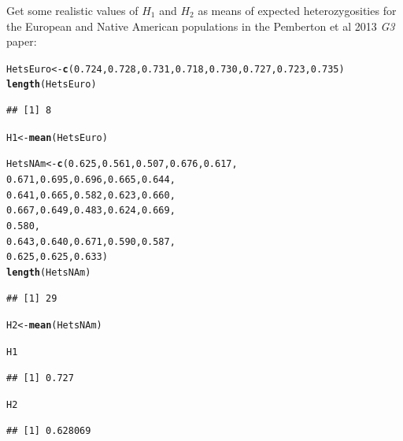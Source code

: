 \documentclass{article}\usepackage[]{graphicx}\usepackage[]{color}
\makeatletter
\newcommand{\hlnum}[1]{\textcolor[rgb]{0.686,0.059,0.569}{#1}}%
\newcommand{\hlstd}[1]{\textcolor[rgb]{0.345,0.345,0.345}{#1}}%
\newcommand{\hlkwb}[1]{\textcolor[rgb]{0.69,0.353,0.396}{#1}}%
\newcommand{\hlkwd}[1]{\textcolor[rgb]{0.737,0.353,0.396}{\textbf{#1}}}%
\newenvironment{kframe}{%
 \def\at@end@of@kframe{}%
 \ifinner\ifhmode%
  \def\at@end@of@kframe{\end{minipage}}%
  \begin{minipage}{\columnwidth}%
 \fi\fi%
 \def\FrameCommand##1{\hskip\@totalleftmargin \hskip-\fboxsep
 \colorbox{shadecolor}{##1}\hskip-\fboxsep
     \hskip-\linewidth \hskip-\@totalleftmargin \hskip\columnwidth}%
 \MakeFramed {\advance\hsize-\width
   \@totalleftmargin\z@ \linewidth\hsize
   \@setminipage}}%
 {\par\unskip\endMakeFramed%
 \at@end@of@kframe}
\newenvironment{knitrout}{}{} %
\makeatother
\begin{document}
Get some realistic values of $H_1$ and $H_2$ as means of expected heterozygosities for the European and Native American populations in the Pemberton et al 2013 \textit{G3} paper:
\begin{knitrout}
\color{fgcolor}\begin{kframe}
\begin{alltt}
\hlstd{HetsEuro} \hlkwb{<-} \hlkwd{c}\hlstd{(}\hlnum{0.724}\hlstd{,}\hlnum{0.728}\hlstd{,}\hlnum{0.731}\hlstd{,}\hlnum{0.718}\hlstd{,}\hlnum{0.730}\hlstd{,}\hlnum{0.727}\hlstd{,}\hlnum{0.723}\hlstd{,}\hlnum{0.735}\hlstd{)}
\hlkwd{length}\hlstd{(HetsEuro)}
\end{alltt}
\begin{verbatim}
## [1] 8
\end{verbatim}
\begin{alltt}
\hlstd{H1} \hlkwb{<-} \hlkwd{mean}\hlstd{(HetsEuro)}

\hlstd{HetsNAm} \hlkwb{<-} \hlkwd{c}\hlstd{(}\hlnum{0.625}\hlstd{,}\hlnum{0.561}\hlstd{,}\hlnum{0.507}\hlstd{,}\hlnum{0.676}\hlstd{,}\hlnum{0.617}\hlstd{,}
             \hlnum{0.671}\hlstd{,}\hlnum{0.695}\hlstd{,}\hlnum{0.696}\hlstd{,}\hlnum{0.665}\hlstd{,}\hlnum{0.644}\hlstd{,}
             \hlnum{0.641}\hlstd{,}\hlnum{0.665}\hlstd{,}\hlnum{0.582}\hlstd{,}\hlnum{0.623}\hlstd{,}\hlnum{0.660}\hlstd{,}
             \hlnum{0.667}\hlstd{,}\hlnum{0.649}\hlstd{,}\hlnum{0.483}\hlstd{,}\hlnum{0.624}\hlstd{,}\hlnum{0.669}\hlstd{,}
             \hlnum{0.580}\hlstd{,}
             \hlnum{0.643}\hlstd{,}\hlnum{0.640}\hlstd{,}\hlnum{0.671}\hlstd{,}\hlnum{0.590}\hlstd{,}\hlnum{0.587}\hlstd{,}
             \hlnum{0.625}\hlstd{,}\hlnum{0.625}\hlstd{,}\hlnum{0.633}\hlstd{)}
\hlkwd{length}\hlstd{(HetsNAm)}
\end{alltt}
\begin{verbatim}
## [1] 29
\end{verbatim}
\begin{alltt}
\hlstd{H2} \hlkwb{<-} \hlkwd{mean}\hlstd{(HetsNAm)}

\hlstd{H1}
\end{alltt}
\begin{verbatim}
## [1] 0.727
\end{verbatim}
\begin{alltt}
\hlstd{H2}
\end{alltt}
\begin{verbatim}
## [1] 0.628069
\end{verbatim}
\end{kframe}
\end{knitrout}
\end{document}

